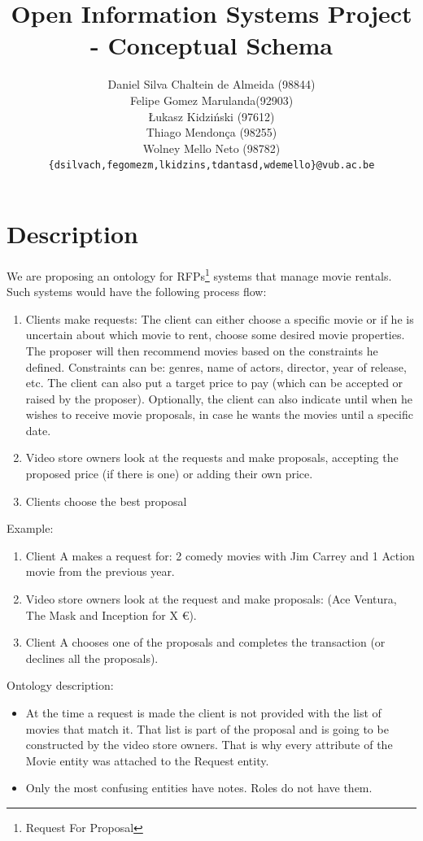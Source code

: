 \documentclass[a4paper,10pt]{article}
\title{Open Information Systems Project - Conceptual Schema}
\author{Daniel Silva Chaltein de Almeida (98844)\\
Felipe Gomez Marulanda(92903)\\
Łukasz Kidziński (97612)\\
Thiago Mendonça (98255)\\
Wolney Mello Neto (98782)\\
\texttt{\{{}dsilvach,fegomezm,lkidzins,tdantasd,wdemello\}@vub.ac.be}}
\begin{document}
\maketitle

\section{Description}

We are proposing an ontology for RFPs\footnote{Request For Proposal} systems that manage movie rentals. Such systems would have the following process flow:
\begin{enumerate}
  \item Clients make requests: The client can either choose a specific movie or if he is uncertain about which movie to rent, choose some desired movie properties. The proposer will then recommend movies based on the constraints he defined.
    \subitem Constraints can be: genres, name of actors, director, year of release, etc.
    \subitem The client can also put a target price to pay (which can be accepted or raised by the proposer).
    \subitem Optionally, the client can also indicate until when he wishes to receive movie proposals, in case he wants the movies until a specific date.
  \item Video store owners look at the requests and make proposals, accepting the proposed price (if there is one) or adding their own price.
  \item Clients choose the best proposal
\end{enumerate}

Example:
\begin{enumerate}
  \item Client A makes a request for: 2 comedy movies with Jim Carrey and 1 Action movie from the previous year.
  \item Video store owners look at the request and make proposals: (Ace Ventura, The Mask and Inception for X \euro).
  \item Client A chooses one of the proposals and completes the transaction (or declines all the proposals).
\end{enumerate}

Ontology description:
\begin{itemize}
  \item At the time a request is made the client is not provided with the list of movies that match it. That list is part of the proposal and is going to be constructed by the video store owners. That is why every attribute of the Movie entity was attached to the Request entity.
  \item Only the most confusing entities have notes. Roles do not have them.
\end{itemize}
\end{document}
